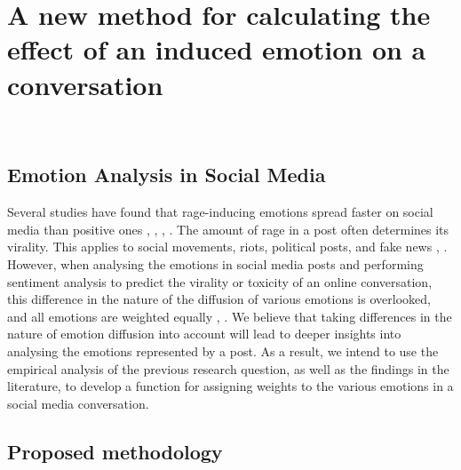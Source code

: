 \section{A new method for calculating the effect of an induced emotion on a conversation}~\label{sec:approach}
\subsection{Emotion Analysis in Social Media}
Several studies have found that rage-inducing emotions spread faster on social media than positive ones \cite{bacaksizlar2019understanding}, \cite{steinert2022emotions}, \cite{chuai2020anger}, \cite{yi2022depicting}. The amount of rage in a post often determines its virality. This applies to social movements, riots, political posts, and fake news \cite{solovev2022moral}, \cite{mirbabaie2021development}. However, when analysing the emotions in social media posts and performing sentiment analysis to predict the virality or toxicity of an online conversation, this difference in the nature of the diffusion of various emotions is overlooked, and all emotions are weighted equally \cite{yue2019survey}, \cite{nemes2021social}. We believe that taking differences in the nature of emotion diffusion into account will lead to deeper insights into analysing the emotions represented by a post. As a result, we intend to use the empirical analysis of the previous research question, as well as the findings in the literature, to develop a function for assigning weights to the various emotions in a social media conversation.
\subsection{Proposed methodology}
